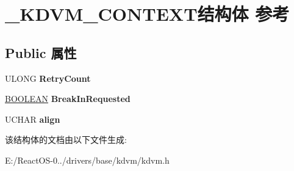 \hypertarget{struct___k_d_v_m___c_o_n_t_e_x_t}{}\section{\+\_\+\+K\+D\+V\+M\+\_\+\+C\+O\+N\+T\+E\+X\+T结构体 参考}
\label{struct___k_d_v_m___c_o_n_t_e_x_t}
\subsection*{Public 属性}
\begin{DoxyCompactItemize}
\item 
\mbox{\label{struct___k_d_v_m___c_o_n_t_e_x_t_a86a0a2c647fed31052f81f6694a7d9df}} 
U\+L\+O\+NG {\bfseries Retry\+Count}
\item 
\mbox{\label{struct___k_d_v_m___c_o_n_t_e_x_t_a449a23353ae7d491b40c5d03ebe5a580}} 
\hyperlink{_processor_bind_8h_a112e3146cb38b6ee95e64d85842e380a}{B\+O\+O\+L\+E\+AN} {\bfseries Break\+In\+Requested}
\item 
\mbox{\label{struct___k_d_v_m___c_o_n_t_e_x_t_a44d6b45aa0091a958a5c223e544d61fc}} 
U\+C\+H\+AR {\bfseries align}
\end{DoxyCompactItemize}


该结构体的文档由以下文件生成\+:\begin{DoxyCompactItemize}
\item 
E\+:/\+React\+O\+S-\/0../drivers/base/kdvm/kdvm.\+h\end{DoxyCompactItemize}
